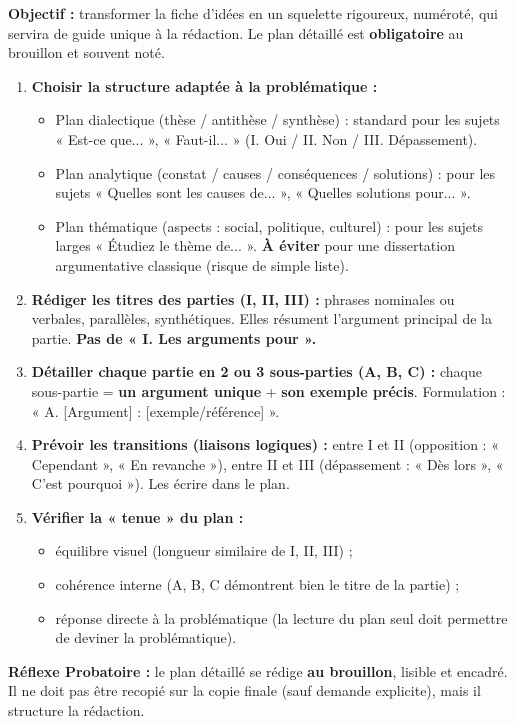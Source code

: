 \documentclass[11pt]{article}
\newcommand{\cle}[1]{{\popxbold\color{popdark}#1}}
\begin{document}
\begin{methode}
    \textbf{Objectif :} transformer la fiche d'idées en un squelette rigoureux, numéroté, qui servira de guide unique à la rédaction. Le plan détaillé est \textbf{obligatoire} au brouillon et souvent noté.
    \begin{enumerate}
        \item \textbf{Choisir la structure adaptée à la problématique :}
            \begin{itemize}
                \item \cle{Plan dialectique (thèse / antithèse / synthèse)} : standard pour les sujets « Est-ce que... », « Faut-il... » (I. Oui / II. Non / III. Dépassement).
                \item \cle{Plan analytique (constat / causes / conséquences / solutions)} : pour les sujets « Quelles sont les causes de... », « Quelles solutions pour... ».
                \item \cle{Plan thématique (aspects : social, politique, culturel)} : pour les sujets larges « Étudiez le thème de... ». \textbf{À éviter} pour une dissertation argumentative classique (risque de simple liste).
            \end{itemize}
        \item \textbf{Rédiger les titres des parties (I, II, III) :} phrases nominales ou verbales, parallèles, synthétiques. Elles résument l'argument principal de la partie. \textbf{Pas de « I. Les arguments pour ».}
        \item \textbf{Détailler chaque partie en 2 ou 3 sous-parties (A, B, C) :} chaque sous-partie = \textbf{un argument unique} + \textbf{son exemple précis}. Formulation : « A. [Argument] : [exemple/référence] ».
        \item \textbf{Prévoir les transitions (liaisons logiques) :} entre I et II (opposition : « Cependant », « En revanche »), entre II et III (dépassement : « Dès lors », « C'est pourquoi »). Les écrire dans le plan.
        \item \textbf{Vérifier la « tenue » du plan :}
            \begin{itemize}
                \item équilibre visuel (longueur similaire de I, II, III) ;
                \item cohérence interne (A, B, C démontrent bien le titre de la partie) ;
                \item réponse directe à la problématique (la lecture du plan seul doit permettre de deviner la problématique).
            \end{itemize}
    \end{enumerate}
    \textbf{Réflexe Probatoire :} le plan détaillé se rédige \textbf{au brouillon}, lisible et encadré. Il ne doit pas être recopié sur la copie finale (sauf demande explicite), mais il structure la rédaction.
\end{methode}
\end{document}
